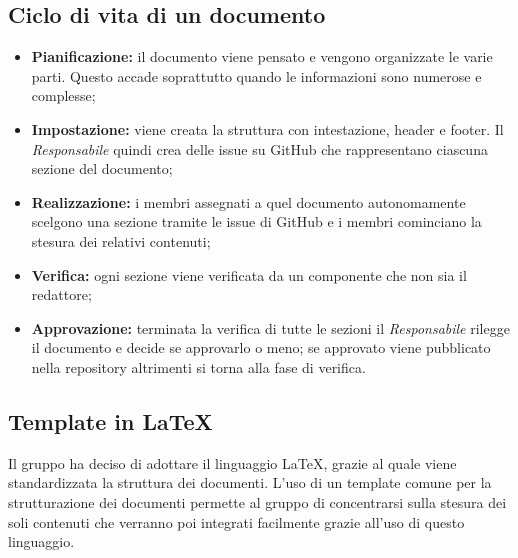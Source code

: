 \subsection{Ciclo di vita di un documento}
\begin{itemize}
    \item \textbf{Pianificazione:} il documento viene pensato e vengono organizzate le varie parti. Questo accade soprattutto quando le informazioni sono numerose e complesse;
    \item \textbf{Impostazione:} viene creata la struttura con intestazione, header e footer. Il \textit{Responsabile} quindi crea delle issue su GitHub che rappresentano ciascuna sezione del documento;
    \item \textbf{Realizzazione:} i membri assegnati a quel documento autonomamente scelgono una sezione tramite le issue di GitHub e i membri cominciano la stesura dei relativi contenuti;
    \item \textbf{Verifica:} ogni sezione viene verificata da un componente che non sia il redattore;
    \item \textbf{Approvazione:} terminata la verifica di tutte le sezioni il \textit{Responsabile} rilegge il documento e decide se approvarlo o meno; se approvato viene pubblicato nella repository altrimenti si torna alla fase di verifica.
\end{itemize}
\subsection{Template in \LaTeX{}}
Il gruppo ha deciso di adottare il linguaggio \LaTeX{}, grazie al quale viene standardizzata
la struttura dei documenti. L’uso di un template comune per la strutturazione dei documenti permette al gruppo di concentrarsi sulla stesura dei soli contenuti che verranno poi integrati facilmente grazie all'uso di questo linguaggio.
